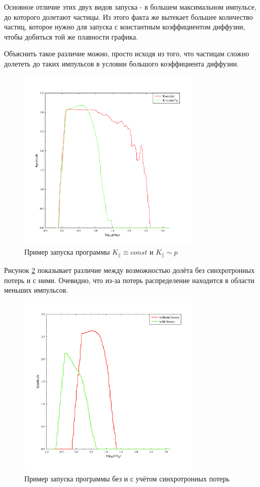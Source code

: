 \documentclass[a4paper,14pt]{extarticle} %
\begin{document}
Основное отличие этих двух видов запуска - в большем максимальном импульсе, до которого долетают частицы. Из этого факта же вытекает большее количество частиц, которое нужно для запуска с константным коэффициентом диффузии, чтобы добиться той же плавности графика.

Объяснить такое различие можно, просто исходя из того, что частицам сложно долететь до таких импульсов в условии большого коэффициента диффузии.
\begin{figure}[!htb]
\centering
\includegraphics[width=250pt]{stoh_bom_or_not}
\caption{Пример запуска программы $K_\parallel\equiv const$ и $K_\parallel \sim p $}
\label{res/stoh/bom}
\end{figure}
Рисунок \ref{res/stoh/sinh} показывает различие между возможностью долёта без синхротронных потерь и с ними. Очевидно, что из-за потерь распределение находится в области меньших импульсов. 
\begin{figure}[!htb]
\centering
\includegraphics[width=250pt]{stoh_sinh_or_not}
\caption{Пример запуска программы без и с учётом синхротронных потерь}
\label{res/stoh/sinh}
\end{figure}
\end{document}
